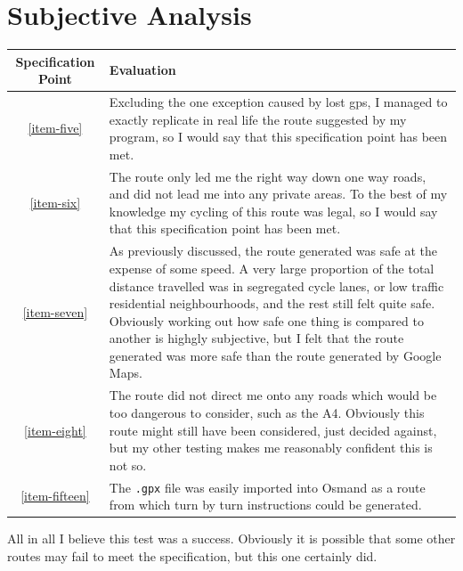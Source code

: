\documentclass[11pt,twoside,a4paper]{report}
\begin{document}
\section{Subjective Analysis}
\begin{center}
\begin{tabular}{|c | p{8cm}|}
\hline
Specification Point & Evaluation\\
\hline
\ref{item-five} & Excluding the one exception caused by lost gps, I managed to exactly replicate in real life the route suggested by my program, so I would say that this specification point has been met. \\
\hline
\ref{item-six} & The route only led me the right way down one way roads, and did not lead me into any private areas. To the best of my knowledge my cycling of this route was legal, so I would say that this specification point has been met. \\
\hline
\ref{item-seven} & As previously discussed, the route generated was safe at the expense of some speed. A very large proportion of the total distance travelled was in segregated cycle lanes, or low traffic residential neighbourhoods, and the rest still felt quite safe. Obviously working out how safe one thing is compared to another is highgly subjective, but I felt that the route generated was more safe than the route generated by Google Maps.\\
\hline
\ref{item-eight} & The route did not direct me onto any roads which would be too dangerous to consider, such as the A4. Obviously this route might still have been considered, just decided against, but my other testing makes me reasonably confident this is not so. \\
\hline
\ref{item-fifteen} & The \texttt{.gpx} file was easily imported into Osmand as a route from which turn by turn instructions could be generated.\\
\hline
\end{tabular}
\end{center}
All in all I believe this test was a success. Obviously it is possible that some other routes may fail to meet the specification, but this one certainly did. 
\end{document}
